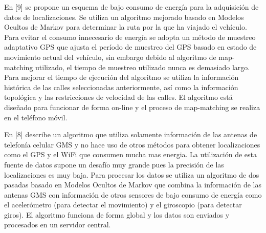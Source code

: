 En [9] se propone un esquema de bajo consumo de energía para la adquisición de datos de localizaciones. Se utiliza un algoritmo mejorado basado en Modelos Ocultos de Markov para determinar la ruta por la que ha viajado el vehículo. Para evitar el consumo innecesario de energía se adopta un método de muestreo adaptativo GPS que ajusta el período de muestreo del GPS basado en estado de movimiento actual del vehículo, sin embargo debido al algoritmo de map-matching utilizado, el tiempo de muestreo utilizado nunca es demasiado largo. Para mejorar el tiempo de ejecución del algoritmo se utiliza la información histórica de las calles seleccionadas anteriormente, así como la información topológica y las restricciones de velocidad de las calles. El algoritmo está diseñado para funcionar de forma on-line y el proceso de map-matching se realiza en el teléfono móvil.

En [8] describe un algoritmo que utiliza solamente información de las antenas de telefonía celular GMS y no hace uso de otros métodos para obtener localizaciones como el GPS y el WiFi que consumen mucha mas energia. La utilización de esta fuente de datos supone un desafío muy grande pues la precisión de las localizaciones es muy baja. Para procesar los datos se utiliza un algoritmo de dos pasadas basado en Modelos Ocultos de Markov que combina la información de las antenas GMS con información de otros sensores de bajo consumo de energía como el acelerómetro (para detectar el movimiento) y el giroscopio (para detectar giros). El algoritmo funciona de forma global y los datos son enviados y procesados en un servidor central.

